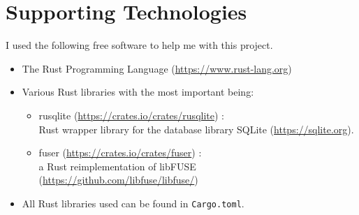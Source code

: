 \chapter*{Supporting Technologies}
\vspace{1cm}

\noindent
I used the following free software to help me with this project.
\begin{itemize}
    \item The Rust Programming Language (\url{https://www.rust-lang.org})
    \item[] Various Rust libraries with the most important being:
    \begin{itemize}
        \item rusqlite (\url{https://crates.io/crates/rusqlite}) : \\
            Rust wrapper library for the database library SQLite
            (\url{https://sqlite.org}).
        \item fuser (\url{https://crates.io/crates/fuser}) : \\
            a Rust reimplementation of
            libFUSE (\url{https://github.com/libfuse/libfuse/})
    \end{itemize}
    \item[] All Rust libraries used can be found in \texttt{Cargo.toml}.
\end{itemize}

